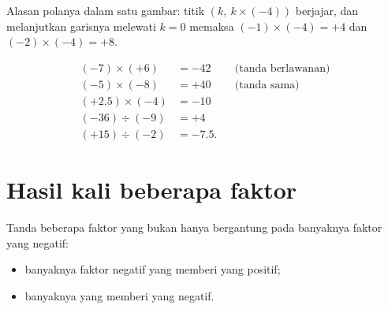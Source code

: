 \begin{omfigure}

{\small Alasan polanya dalam satu gambar: titik
$(k,\ k \times (-4))$ berjajar, dan melanjutkan garisnya melewati
$k = 0$ memaksa $(-1)\times(-4) = +4$ dan $(-2)\times(-4) = +8$.}
\end{omfigure}

\begin{example}\label{ex:g8:negprod:products}
\begin{align*}
(-7) \times (+6) &= -42 && \text{(tanda berlawanan)} \\
(-5) \times (-8) &= +40 && \text{(tanda sama)} \\
(+2.5) \times (-4) &= -10 \\
(-36) \div (-9) &= +4 \\
(+15) \div (-2) &= -7.5 .
\end{align*}
\end{example}

\section{Hasil kali beberapa faktor}

\begin{proposition}\label{prop:g8:negprod:many}
Tanda  beberapa faktor yang bukan  hanya bergantung pada
banyaknya faktor yang negatif:
\begin{itemize}
  \item banyaknya faktor negatif yang \emph{} memberi 
        yang positif;
  \item banyaknya yang \emph{} memberi  yang negatif.
\end{itemize}
\end{proposition}

